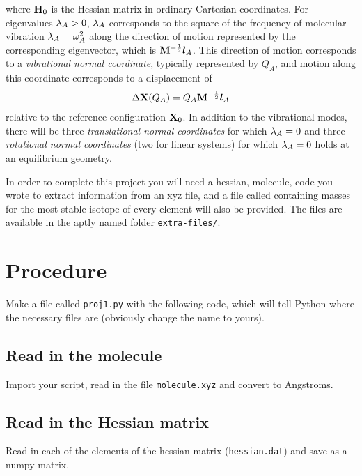 \documentclass[11pt]{article}
\begin{document}
where $\mathbf{H}_0$ is the Hessian matrix in ordinary Cartesian coordinates. For
eigenvalues $\lambda_A > 0$, $\lambda_A$ corresponds to the square of the frequency of
molecular vibration $\lambda_A = \omega_A^2$ along the direction of motion represented
by the corresponding eigenvector, which is $\mathbf{M}^{-\frac{1}{2}} \bm{l}_A$.
This direction of motion corresponds to a {\it vibrational normal coordinate},
typically represented by $Q_A$, and motion along this coordinate corresponds to
a displacement of
\begin{align}
    \Delta\mathbf{X}(Q_A) = Q_A\mathbf{M}^{-\frac{1}{2}}\bm{l}_A
\end{align}
relative to the reference configuration $\mathbf{X}_0$. In addition to the
vibrational modes, there will be three {\it translational normal coordinates}
for which $\lambda_A=0$ and three {\it rotational normal coordinates} (two for
linear systems) for which $\lambda_A=0$ holds at an equilibrium geometry.

In order to complete this project you will need a hessian, molecule, code you
wrote to extract information from an xyz file, and a file called 
containing masses for the most stable isotope of every element will also be
provided. The files are available in the aptly named folder
\texttt{extra-files/}.

\newpage
\section{Procedure}

Make a file called \texttt{proj1.py} with the following code, which will tell
Python where the necessary files are (obviously change the name to yours).


\subsection{Read in the molecule}
Import your script, read in the file \texttt{molecule.xyz} and convert to
Angstroms.

\subsection{Read in the Hessian matrix}
Read in each of the elements of the hessian matrix (\texttt{hessian.dat}) and
save as a numpy matrix.
\end{document}
